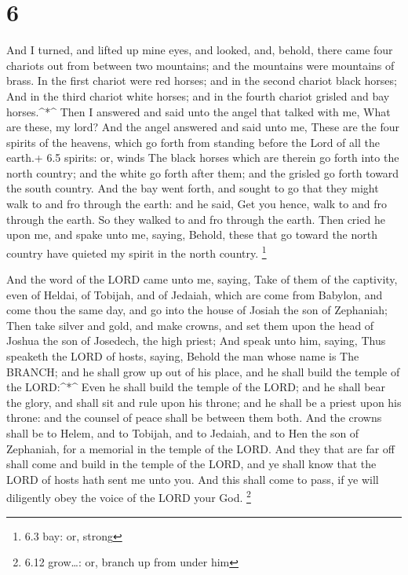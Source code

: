 \hypertarget{section-5}{%
\section{6}\label{section-5}}

 And I turned, and lifted up mine eyes, and looked, and,
behold, there came four chariots out from between two mountains; and the
mountains were mountains of brass.  In the first chariot
were red horses; and in the second chariot black horses; 
And in the third chariot white horses; and in the fourth chariot grisled
and bay horses.\^{}*\^{}  Then I answered and said unto the
angel that talked with me, What are these, my lord?  And the
angel answered and said unto me, These are the four spirits of the
heavens, which go forth from standing before the Lord of all the earth.+
6.5 spirits: or, winds  The black horses which are therein
go forth into the north country; and the white go forth after them; and
the grisled go forth toward the south country.  And the bay
went forth, and sought to go that they might walk to and fro through the
earth: and he said, Get you hence, walk to and fro through the earth. So
they walked to and fro through the earth.  Then cried he
upon me, and spake unto me, saying, Behold, these that go toward the
north country have quieted my spirit in the north country. \footnote{6.3
  bay: or, strong}

 And the word of the LORD came unto me, saying,
 Take of them of the captivity, even of Heldai, of Tobijah,
and of Jedaiah, which are come from Babylon, and come thou the same day,
and go into the house of Josiah the son of Zephaniah;  Then
take silver and gold, and make crowns, and set them upon the head of
Joshua the son of Josedech, the high priest;  And speak
unto him, saying, Thus speaketh the LORD of hosts, saying, Behold the
man whose name is The BRANCH; and he shall grow up out of his place, and
he shall build the temple of the LORD:\^{}*\^{}  Even he
shall build the temple of the LORD; and he shall bear the glory, and
shall sit and rule upon his throne; and he shall be a priest upon his
throne: and the counsel of peace shall be between them both.
 And the crowns shall be to Helem, and to Tobijah, and to
Jedaiah, and to Hen the son of Zephaniah, for a memorial in the temple
of the LORD.  And they that are far off shall come and
build in the temple of the LORD, and ye shall know that the LORD of
hosts hath sent me unto you. And this shall come to pass, if ye will
diligently obey the voice of the LORD your God. \footnote{6.12
  grow\ldots: or, branch up from under him}

